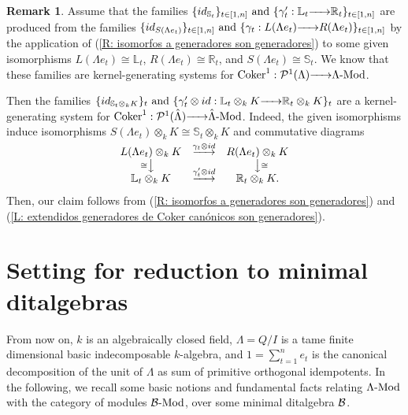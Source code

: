 \documentclass{article}
\theoremstyle{definition}
\newtheorem{remark}[theorem]{Remark}
\newcommand{\Coker}{{ \rm Coker }}
\newcommand{\Mod}{{ \rm Mod }}
\newcommand{\g}{\hbox{-}}
\newcommand{\hueca}[1]{\mathbb{#1}}
\newcommand{\rightmap}[1]{\smash{\mathop{\hbox to 
20pt{\rightarrowfill}}\limits^{#1}}}
\newcommand{\shortlmapdown}[1]
{\llap{$\vcenter{\hbox{$\scriptstyle#1$}}$}\big\downarrow}
\newcommand{\shortrmapdown}[1]
{\big\downarrow\rlap{$\vcenter{\hbox{$\scriptstyle#1$}}$}}
\begin{document}
\begin{remark}\label{R: extendidos de generadores son generadores} 
Assume that the families 
$
\{id_{\hueca{S}_t}\}_{t\in [1,n]}\hbox{ and } 
\{\gamma'_t:\hueca{L}_t\rightmap{}\hueca{R}_t\}_{t\in [1,n]}$
 are produced from the families 
$
\{id_{S(\Lambda e_t)}\}_{t\in [1,n]}\hbox{ and }
\{\gamma_t:L(\Lambda e_t)\rightmap{}R(\Lambda e_t)\}_{t\in [1,n]}$ by the application of (\ref{R: isomorfos a generadores son generadores}) to some given  isomorphisms 
 $L(\Lambda e_t)\cong \hueca{L}_t$, $R(\Lambda e_t)\cong \hueca{R}_t$, and $S(\Lambda e_t)\cong \hueca{S}_t$. 
We know that these families are kernel-generating systems for $\Coker^1:{\cal P}^1(\Lambda)\rightmap{}\Lambda\g\Mod$. 

Then the families 
$
\{id_{\hueca{S}_t\otimes_kK}\}_t \hbox{ and } 
\{\gamma'_t\otimes id:\hueca{L}_t\otimes_kK\rightmap{}\hueca{R}_t\otimes_kK\}_t$
 are a kernel-generating  system  for $\Coker^1:
{\cal P}^1(\hat{\Lambda})\rightmap{}\hat{\Lambda}\g\Mod$. 
Indeed, the given isomorphisms induce  isomorphisms $S(\Lambda e_t)\otimes_kK\cong \hueca{S}_t\otimes_kK$ and commutative diagrams  
$$\begin{matrix}L(\Lambda e_t)\otimes_kK&\rightmap{\gamma_t\otimes id}&R(\Lambda e_t)\otimes_kK\\
\shortlmapdown{\cong}&&\shortrmapdown{\cong}\\ \hueca{L}_t\otimes_k K&\rightmap{\gamma'_t\otimes id}&\hueca{R}_t\otimes_kK.\\
\end{matrix}$$
Then, our claim follows from (\ref{R: isomorfos a generadores son generadores}) and (\ref{L: extendidos generadores de Coker  canónicos son generadores}). 
\end{remark}


\section{Setting for reduction to minimal ditalgebras}

From now on, $k$ is an algebraically closed field, $\Lambda=Q/I$ is a tame  finite dimensional basic indecomposable $k$-algebra, and $1=\sum_{t=1}^ne_t$ is the canonical decomposition of the unit of $\Lambda$ as sum of primitive orthogonal idempotents.
In the following, we recall some basic notions and  fundamental facts relating $\Lambda\g\Mod$ with the category of modules ${\cal B}\g\Mod$, over some minimal ditalgebra ${\cal B}$. 
\end{document}
